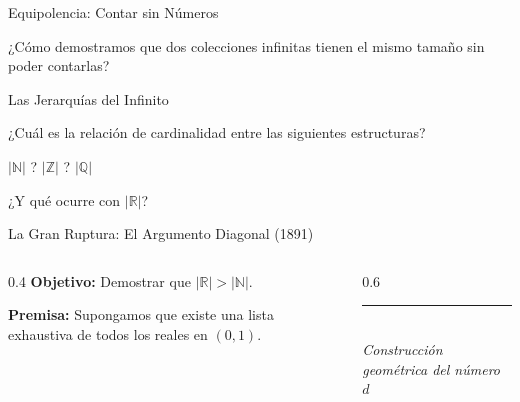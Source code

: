 \documentclass[10pt, aspectratio=169]{beamer}
\begin{document}
\begin{frame}{Equipolencia: Contar sin Números}
    \begin{center}
        ¿Cómo demostramos que dos colecciones infinitas tienen el mismo tamaño sin poder contarlas?
        
        \vspace{0.8cm}
    \end{center}
\end{frame}

\begin{frame}{Las Jerarquías del Infinito}
    \begin{center}
        \Large
        ¿Cuál es la relación de cardinalidad entre las siguientes estructuras?
        
        \vspace{0.8cm}
        $|\mathbb{N}|$ \quad ? \quad $|\mathbb{Z}|$ \quad ? \quad $|\mathbb{Q}|$
        
        \vspace{1.2cm}
        ¿Y qué ocurre con $|\mathbb{R}|$?
    \end{center}
\end{frame}

\begin{frame}{La Gran Ruptura: El Argumento Diagonal (1891)}
    \begin{columns}
        \begin{column}{0.4\textwidth}
            \textbf{Objetivo:} 
            Demostrar que $|\mathbb{R}| > |\mathbb{N}|$.
            
            \vspace{0.5cm}
            \textbf{Premisa:}
            Supongamos que existe una lista exhaustiva de todos los reales en $(0,1)$.
        \end{column}
        \begin{column}{0.6\textwidth}
            \centering
            \rule{0.9\textwidth}{4cm} %
            \\ \vspace{0.2cm} \small \textit{Construcción geométrica del número $d$}
        \end{column}
    \end{columns}
\end{frame}
\end{document}
